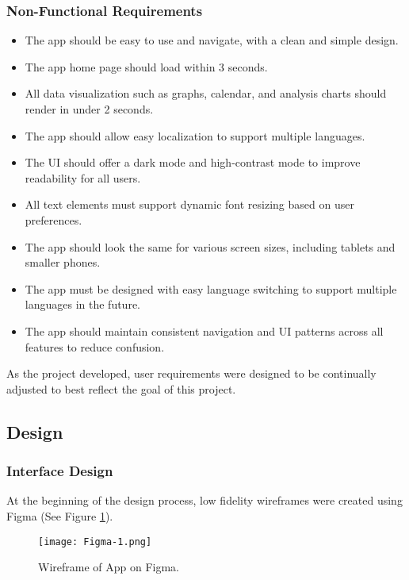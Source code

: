 \subsubsection{Non-Functional Requirements}
\begin{itemize}
  \item The app should be easy to use and navigate, with a clean and simple design.
  \item The app home page should load within 3 seconds.
  \item All data visualization such as graphs, calendar, and analysis charts should render in under 2 seconds.
  \item The app should allow easy localization to support multiple languages.
  \item The UI should offer a dark mode and high-contrast mode to improve readability for all users.
  \item All text elements must support dynamic font resizing based on user preferences.
  \item The app should look the same for various screen sizes, including tablets and smaller phones.
  \item The app must be designed with easy language switching to support multiple languages in the future.
  \item The app should maintain consistent navigation and UI patterns across all features to reduce confusion.
\end{itemize}

As the project developed, user requirements were designed to be continually adjusted to best reflect the goal of this project.

\subsection{Design}

\subsubsection{Interface Design}
At the beginning of the design process, low fidelity wireframes were created using Figma (See Figure \ref{figure:figma-1}).

\begin{figure}[h!!]
  \begin{center}
    \texttt{[image: Figma-1.png]}
    \caption{Wireframe of App on Figma.}
    \label{figure:figma-1}
  \end{center}
\end{figure}

